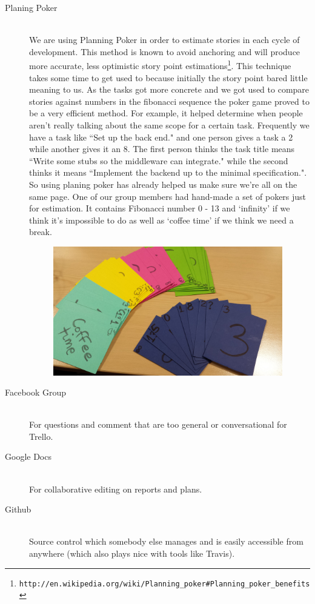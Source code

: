 \documentclass[11pt]{article}
\begin{document}
\begin{description}
\begin{figure}[h!]
\end{figure}
  \item[Planing Poker] \hfill \\
We are using Planning Poker in order to estimate stories in each cycle of development. This method is known to avoid anchoring and will produce more accurate, less optimistic story point estimations\footnote{\tt{http://en.wikipedia.org/wiki/Planning\_poker\#Planning\_poker\_benefits}}. This technique takes some time to get used to because initially the story point bared little meaning to us. As the tasks got more concrete and we got used to compare stories against numbers in the fibonacci sequence the poker game proved to be a very efficient method. 
For example, it helped determine when people aren't really talking about the same scope for a certain task. Frequently we have a task like ``Set up the back end." and one person gives a task a 2 while another gives it an 8. The first person thinks the task title means ``Write some stubs so the middleware can integrate." while the second thinks it means ``Implement the backend up to the minimal specification.". So using planing poker has already helped us make sure we're all on the same page. One of our group members had hand-made a set of pokers just for estimation. It contains Fibonacci number 0 - 13 and ‘infinity’ if we think it’s impossible to do as well as ‘coffee time’ if we think we need a break. 
\begin{figure}[h!]
\centering
\includegraphics[width=100mm]{planningPokers.jpg}
\end{figure}  
  \item[Facebook Group] \hfill \\
  For questions and comment that are too general or conversational for Trello.
  \item[Google Docs] \hfill \\
  For collaborative editing on reports and plans.
  \item[Github] \hfill \\
  Source control which somebody else manages and is easily accessible from anywhere
  (which also plays nice with tools like Travis).



\end{description}
\end{document}
